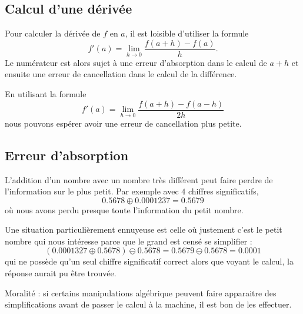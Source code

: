 \subsection{Calcul d'une dérivée}

Pour calculer la dérivée de \( f\) en \( a\), il est loisible d'utiliser la formule
\begin{equation}
	f'(a)=\lim_{h\to 0} \frac{ f(a+h)-f(a) }{ h }.
\end{equation}
Le numérateur est alors sujet à une erreur d'absorption dans le calcul de \( a+h\) et ensuite une erreur de cancellation dans le calcul de la différence.

En utilisant la formule
\begin{equation}
	f'(a)=\lim_{h\to 0} \frac{ f(a+h)-f(a-h) }{ 2h }
\end{equation}
nous pouvons espérer avoir une erreur de cancellation plus petite.


\subsection{Erreur d'absorption}

L'addition d'un nombre avec un nombre très différent peut faire perdre de l'information sur le plus petit. Par exemple avec \( 4\) chiffres significatifs,
\begin{equation}
	0.5678\oplus 0.0001237=0.5679
\end{equation}
où nous avons perdu presque toute l'information du petit nombre.

Une situation particulièrement ennuyeuse est celle où justement c'est le petit nombre qui nous intéresse parce que le grand est censé se simplifier :
\begin{equation}
	(0.0001327\oplus 0.5678)\ominus 0.5678=0.5679\ominus 0.5678=0.0001
\end{equation}
qui ne possède qu'un seul chiffre significatif correct alors que voyant le calcul, la réponse aurait pu être trouvée.

Moralité : si certains manipulations algébrique peuvent faire apparaitre des simplifications avant de passer le calcul à la machine, il est bon de les effectuer.


